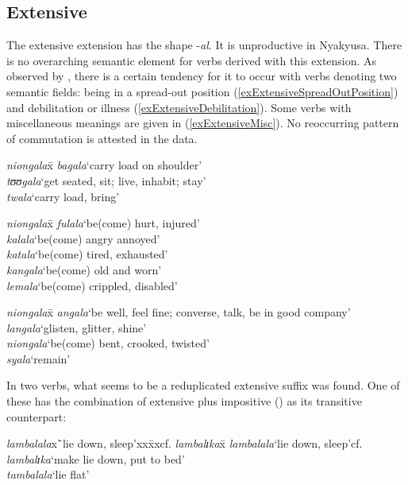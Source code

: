\subsection{Extensive} \label{extensive}
The extensive extension has the shape -\textit{al}. It is unproductive in Nyakyusa. There is no overarching semantic element for verbs derived with this extension. As observed by \citet[77]{SchadebergT2003a}, there is a certain tendency for it to occur with verbs denoting two semantic fields: being in a spread-out position (\ref{exExtensiveSpreadOutPosition}) and debilitation or illness (\ref{exExtensiveDebilitation}). Some verbs with miscellaneous meanings are given in (\ref{exExtensiveMisc}). No reoccurring pattern of commutation is attested in the data.
\begin{exe}
\ex \label{exExtensiveSpreadOutPosition}
\begin{tabbing}
\textit{niongala}x\=\kill
\textit{bagala}\>`carry load on shoulder'\\
\textit{tʊʊgala}\>`get seated, sit; live, inhabit; stay'\\
\textit{twala}\>`carry load, bring'
\end{tabbing}
\ex\label{exExtensiveDebilitation}
\begin{tabbing}
\textit{niongala}x\=\kill
\textit{fulala}\>`be(come) hurt, injured'\\
\textit{kalala}\>`be(come) angry annoyed'\\
\textit{katala}\>`be(come) tired, exhausted'\\
\textit{kangala}\>`be(come) old and worn'\\
\textit{lemala}\>`be(come) crippled, disabled'
\end{tabbing}
\ex\label{exExtensiveMisc}
\begin{tabbing}
\textit{niongala}x\=\kill
\textit{angala}\>`be well, feel fine; converse, talk, be in good company'\\
\textit{langala}\>`glisten, glitter, shine'\\
\textit{niongala}\>`be(come) bent, crooked, twisted'\\
\textit{syala}\>`remain'
\end{tabbing}
\end{exe}

In two verbs, what seems to be a reduplicated extensive suffix was found. One of these has the combination of extensive plus impositive () as its transitive counterpart:
\begin{exe}
\ex
\begin{tabbing}
\textit{lambalala}x\=`lie down, sleep'xx\=xxcf. \textit{lambalɪka}x\=\kill
\textit{lambalala}\>`lie down, sleep'\>cf. \textit{lambalɪka}\>`make lie down, put to bed'\\
\textit{tambalala}\>`lie flat'
\end{tabbing}
\end{exe}
